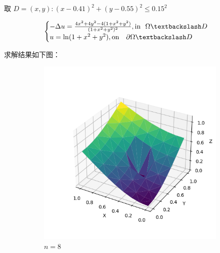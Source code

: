 \documentclass[lang=cn,a4paper,newtx,bibend=bibtex]{elegantpaper}
\begin{document}
取 $D = {(x, y) : (x - 0.41)^2 + (y - 0.55)^2 \le 0.15^2}$


\[
\begin{cases}
  - \Delta u = \frac{4x^2 + 4y^2 - 4(1 + x^2 + y^2)}{(1 + x^2 + y^2)^2}, \text{in~~} \Omega \fxg D \\
  u = \ln (1 + x^2 + y^2), \text{on ~~} \partial \Omega \fxg D
\end{cases}
\]

求解结果如下图：

\begin{figure}[H]
  \centering
  \begin{subfigure}[b]{0.18\textwidth}
      \includegraphics[width=\textwidth]{../../res_bac/res-[data|3-Dirichlet-irregular-a8].png}
      \caption{$n =  8$}
  \end{subfigure}
  \hfill
  \begin{subfigure}[b]{0.18\textwidth}

\end{subfigure}
\end{figure}
\end{document}

